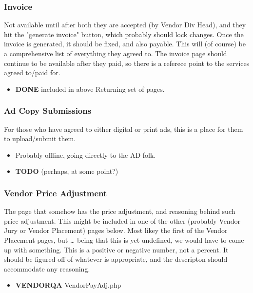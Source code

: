 \documentclass[captions=tablesignature]{scrartcl}
\begin{document}
\subsubsection{Invoice}
\label{sec-3-1-8}
Not available until after both they are accepted (by Vendor
Div Head), and they hit the "generate invoice" button, which
probably should lock changes.  Once the invoice is generated, it
should be fixed, and also payable.
This will (of course) be a comprehensive list of everything they
agreed to.  The invoice page should continue to be available after
they paid, so there is a referece point to the services agreed
to/paid for.
\begin{itemize}
\item {\bfseries\sffamily DONE} included in above Returning set of pages.
\label{sec-3-1-8-1}
\end{itemize}

\subsubsection{Ad Copy Submissions}
\label{sec-3-1-9}
For those who have agreed to either digital or print ads, this is
a place for them to upload/submit them.
\begin{itemize}
\item Probably offline, going directly to the AD folk.
\end{itemize}
\begin{itemize}
\item {\bfseries\sffamily TODO} (perhaps, at some point?)
\label{sec-3-1-9-1}
\end{itemize}

\subsubsection{Vendor Price Adjustment}
\label{sec-3-1-10}
The page that somehow has the price adjustment, and reasoning
behind such price adjustment.
This might be included in one of the other (probably Vendor Jury
or Vendor Placement) pages below.  Most likey the first of the
Vendor Placement pages, but \ldots{} being that this is yet undefined,
we would have to come up with something.
This is a positive or negative number, not a percent.  It should
be figured off of whatever is appropriate, and the descripton
should accommodate any reasoning.
\begin{itemize}
\item {\bfseries\sffamily VENDORQA} VendorPayAdj.php
\label{sec-3-1-10-1}
\end{itemize}
\end{document}
